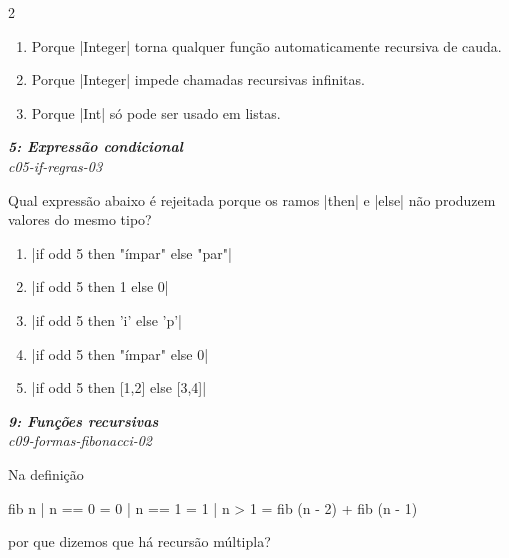\documentclass[a4paper,10pt,brazil]{article}
\begin{document}
\begin{multicols}{2}
\begin{enumerate}
  \item Porque \haskellinline|Integer| torna qualquer função automaticamente recursiva de cauda.

  \item Porque \haskellinline|Integer| impede chamadas recursivas infinitas.

  \item Porque \haskellinline|Int| só pode ser usado em listas.


\end{enumerate}

\begin{flushright}
  \footnotesize
  \textit{\textbf{5: Expressão condicional}}\\
  \textit{c05-if-regras-03}\\

\end{flushright}
Qual expressão abaixo é rejeitada porque os ramos \haskellinline|then| e \haskellinline|else| não produzem valores do mesmo tipo?

\begin{enumerate}
  \item \haskellinline|if odd 5 then "ímpar" else "par"|

  \item \haskellinline|if odd 5 then 1 else 0|

  \item \haskellinline|if odd 5 then 'i' else 'p'|

  \item \haskellinline|if odd 5 then "ímpar" else 0|

  \item \haskellinline|if odd 5 then [1,2] else [3,4]|


\end{enumerate}

\begin{flushright}
  \footnotesize
  \textit{\textbf{9: Funções recursivas}}\\
  \textit{c09-formas-fibonacci-02}\\

\end{flushright}
Na definição
\begin{haskellcode}
fib n
  | n == 0 = 0
  | n == 1 = 1
  | n > 1  = fib (n - 2) + fib (n - 1)
\end{haskellcode}
por que dizemos que há recursão múltipla?


\end{multicols}
\end{document}
